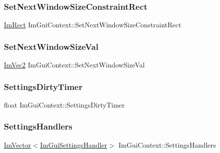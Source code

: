 \hypertarget{struct_im_gui_context_ab0e529d62651845ef9ae265447e1d0c8}{}\label{struct_im_gui_context_ab0e529d62651845ef9ae265447e1d0c8} 
\subsubsection{\texorpdfstring{Set\+Next\+Window\+Size\+Constraint\+Rect}{SetNextWindowSizeConstraintRect}}
{\footnotesize\ttfamily \hyperlink{struct_im_rect}{Im\+Rect} Im\+Gui\+Context\+::\+Set\+Next\+Window\+Size\+Constraint\+Rect}

\hypertarget{struct_im_gui_context_a80a09eeab06dd8abaa79cc5d26998af4}{}\label{struct_im_gui_context_a80a09eeab06dd8abaa79cc5d26998af4} 
\subsubsection{\texorpdfstring{Set\+Next\+Window\+Size\+Val}{SetNextWindowSizeVal}}
{\footnotesize\ttfamily \hyperlink{struct_im_vec2}{Im\+Vec2} Im\+Gui\+Context\+::\+Set\+Next\+Window\+Size\+Val}

\hypertarget{struct_im_gui_context_a7e0dd3aef4a4f0fd85ed39e13824f2ab}{}\label{struct_im_gui_context_a7e0dd3aef4a4f0fd85ed39e13824f2ab} 
\subsubsection{\texorpdfstring{Settings\+Dirty\+Timer}{SettingsDirtyTimer}}
{\footnotesize\ttfamily float Im\+Gui\+Context\+::\+Settings\+Dirty\+Timer}

\hypertarget{struct_im_gui_context_aded9a2cb80c805407734b8bf7d0ef515}{}\label{struct_im_gui_context_aded9a2cb80c805407734b8bf7d0ef515} 
\subsubsection{\texorpdfstring{Settings\+Handlers}{SettingsHandlers}}
{\footnotesize\ttfamily \hyperlink{class_im_vector}{Im\+Vector}$<$\hyperlink{struct_im_gui_settings_handler}{Im\+Gui\+Settings\+Handler}$>$ Im\+Gui\+Context\+::\+Settings\+Handlers}

